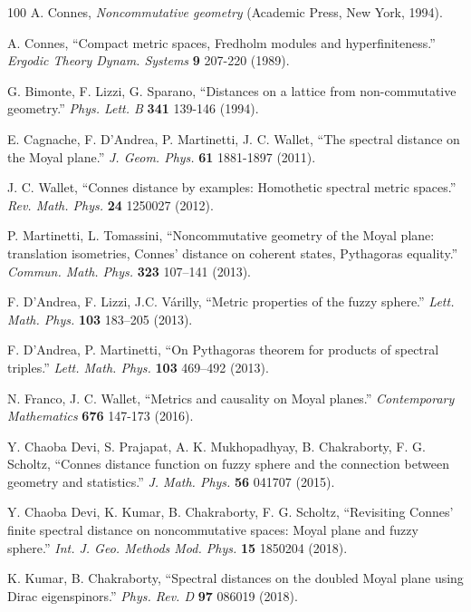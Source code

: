 \documentclass[a4paper,11pt]{article}
\begin{document}
\begin{thebibliography}{100}
	 A. Connes, \textit{Noncommutative geometry}
	(Academic Press, New York, 1994).
	
	 A. Connes, ``Compact metric spaces, Fredholm modules and hyperfiniteness.'' \textit{Ergodic Theory Dynam. Systems}
	\textbf{9} 207-220 (1989).
	
	 G. Bimonte, F. Lizzi, G. Sparano, ``Distances on a
	lattice from non-commutative geometry.'' \textit{Phys. Lett. B}
	\textbf{341} 139-146 (1994).
	
	 E. Cagnache, F. D'Andrea, P. Martinetti, J. C. Wallet,
	``The spectral distance on the Moyal plane.'' \textit{J. Geom.
		Phys.} \textbf{61} 1881-1897 (2011).
	
	 J. C. Wallet, ``Connes distance by examples: Homothetic
	spectral metric spaces.'' \textit{Rev. Math. Phys.}
	\textbf{24} 1250027 (2012).
	
	
	 P. Martinetti, L. Tomassini, ``Noncommutative geometry
	of the Moyal plane: translation isometries, Connes' distance on coherent
	states, Pythagoras equality.'' \textit{Commun. Math. Phys.}
	\textbf{323} 107--141 (2013).
	
	 F. D'Andrea, F. Lizzi, J.C. V\'{a}rilly, ``Metric properties
	of the fuzzy sphere.'' \textit{Lett. Math. Phys.}
	\textbf{103} 183--205 (2013).
	
	 F. D'Andrea, P. Martinetti, ``On Pythagoras theorem
	for products of spectral triples.'' \textit{Lett. Math. Phys.}
	\textbf{103} 469--492 (2013).
	
	
	 N. Franco, J. C. Wallet, ``Metrics and causality on Moyal
	planes.'' \textit{Contemporary Mathematics}
	\textbf{676} 147-173 (2016).
	
	
	 Y. Chaoba Devi, S. Prajapat, A. K. Mukhopadhyay, B.
	Chakraborty, F. G. Scholtz, ``Connes distance function on fuzzy sphere and
	the connection between geometry and statistics.'' \textit{J. Math.
		Phys.} \textbf{56} 041707 (2015).
	
	 Y. Chaoba Devi, K. Kumar, B. Chakraborty, F. G.
	Scholtz, ``Revisiting Connes' finite spectral distance on noncommutative
	spaces: Moyal plane and fuzzy sphere.'' \textit{Int. J. Geo. Methods
		Mod. Phys.} \textbf{15} 1850204 (2018).
	
	 K. Kumar, B. Chakraborty, ``Spectral distances on the
	doubled Moyal plane using Dirac eigenspinors.'' \textit{Phys. Rev.
		D} \textbf{97} 086019 (2018).
	

\end{thebibliography}
\end{document}
